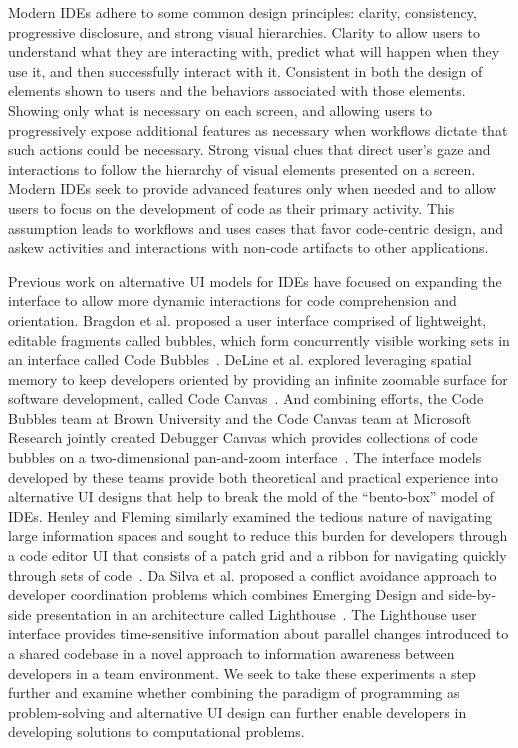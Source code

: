 \documentclass{ppig}
\begin{document}
Modern IDEs adhere to some common design principles: clarity, consistency, progressive disclosure, and strong visual hierarchies.
Clarity to allow users to understand what they are interacting with, predict what will happen when they use it, and then successfully interact with it.
Consistent in both the design of elements shown to users and the behaviors associated with those elements.
Showing only what is necessary on each screen, and allowing users to progressively expose additional features as necessary when workflows dictate that such actions could be necessary.
Strong visual clues that direct user's gaze and interactions to follow the hierarchy of visual elements presented on a screen.
Modern IDEs seek to provide advanced features only when needed and to allow users to focus on the development of code as their primary activity.
This assumption leads to workflows and uses cases that favor code-centric design, and askew activities and interactions with non-code artifacts to other applications.

Previous work on alternative UI models for IDEs have focused on expanding the interface to allow more dynamic interactions for code comprehension and orientation.
Bragdon et al. proposed a user interface comprised of lightweight, editable fragments called bubbles, which form concurrently visible working sets in an interface called Code Bubbles~\cite{bragdon2010bubbles}.
DeLine et al. explored leveraging spatial memory to keep developers oriented by providing an infinite zoomable surface for software development, called Code Canvas~\cite{deline2010canvas}.
And combining efforts, the Code Bubbles team at Brown University and the Code Canvas team at Microsoft Research jointly created Debugger Canvas which provides collections of code bubbles on a two-dimensional pan-and-zoom interface~\cite{deline2012debugger}.
The interface models developed by these teams provide both theoretical and practical experience into alternative UI designs that help to break the mold of the ``bento-box'' model of IDEs.
Henley and Fleming similarly examined the tedious nature of navigating large information spaces and sought to reduce this burden for developers through a code editor UI that consists of a patch grid and a ribbon for navigating quickly through sets of code~\cite{henley2014patchworks}.
Da Silva et al. proposed a conflict avoidance approach to developer coordination problems which combines Emerging Design and side-by-side presentation in an architecture called Lighthouse~\cite{dasilva2006lighthouse}.
The Lighthouse user interface provides time-sensitive information about parallel changes introduced to a shared codebase in a novel approach to information awareness between developers in a team environment.
We seek to take these experiments a step further and examine whether combining the paradigm of programming as problem-solving and alternative UI design can further enable developers in developing solutions to computational problems.
\end{document}
